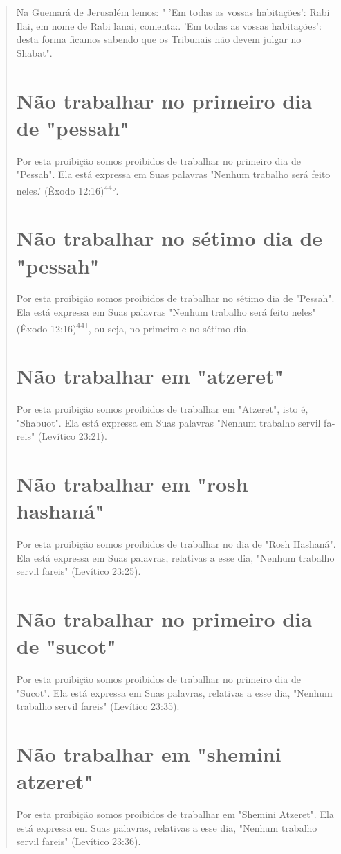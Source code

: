 \begin{quote}
Na Guemará de Jerusalém lemos: " 'Em todas as vossas habitações': Rabi
Ilai, em nome de Rabi lanai, comenta:. 'Em todas as vossas habitações':
desta forma ficamos sabendo que os Tribunais não devem julgar no
Shabat".

\section{Não trabalhar no primeiro dia de "pessah"}

Por esta proibição somos proibidos de trabalhar no primeiro dia de
"Pessah". Ela está expressa em Suas palavras "Nenhum trabalho será feito
ne­les.' (Êxodo 12:16)\textsuperscript{44}°.

\section{Não trabalhar no sétimo dia de "pessah"}

Por esta proibição somos proibidos de trabalhar no sétimo dia de
"Pessah". Ela está expressa em Suas palavras "Nenhum trabalho será feito
ne­les" (Êxodo 12:16)\textsuperscript{441}, ou seja, no primeiro e no
sétimo dia.

\section{Não trabalhar em "atzeret"}

Por esta proibição somos proibidos de trabalhar em "Atzeret", isto é,
"Shabuot". Ela está expressa em Suas palavras "Nenhum trabalho servil
fa­reis" (Levítico 23:21).

\section{Não trabalhar em "rosh hashaná"}

Por esta proibição somos proibidos de trabalhar no dia de "Rosh
Has­haná". Ela está expressa em Suas palavras, relativas a esse dia,
"Nenhum traba­lho servil fareis" (Levítico 23:25).

\section{Não trabalhar no primeiro dia de "sucot"}

Por esta proibição somos proibidos de trabalhar no primeiro dia de
"Sucot". Ela está expressa em Suas palavras, relativas a esse dia,
"Nenhum tra­balho servil fareis" (Levítico 23:35).

\section{Não trabalhar em "shemini atzeret"}

Por esta proibição somos proibidos de trabalhar em "Shemini Atze­ret".
Ela está expressa em Suas palavras, relativas a esse dia, "Nenhum
trabalho servil fareis" (Levítico 23:36).
\end{quote}

